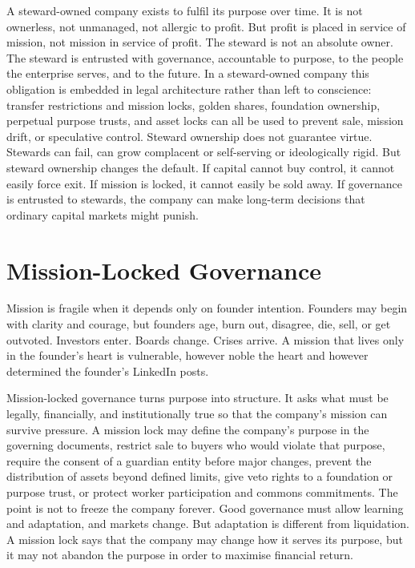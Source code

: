 \documentclass[11pt,a4paper,oneside]{book}
\begin{document}
A steward-owned company exists to fulfil its purpose over time. It is not ownerless, not unmanaged, not allergic to profit. But profit is placed in service of mission, not mission in service of profit. The steward is not an absolute owner. The steward is entrusted with governance, accountable to purpose, to the people the enterprise serves, and to the future. In a steward-owned company this obligation is embedded in legal architecture rather than left to conscience: transfer restrictions and mission locks, golden shares, foundation ownership, perpetual purpose trusts, and asset locks can all be used to prevent sale, mission drift, or speculative control. Steward ownership does not guarantee virtue. Stewards can fail, can grow complacent or self-serving or ideologically rigid. But steward ownership changes the default. If capital cannot buy control, it cannot easily force exit. If mission is locked, it cannot easily be sold away. If governance is entrusted to stewards, the company can make long-term decisions that ordinary capital markets might punish.

\section*{Mission-Locked Governance}

Mission is fragile when it depends only on founder intention. Founders may begin with clarity and courage, but founders age, burn out, disagree, die, sell, or get outvoted. Investors enter. Boards change. Crises arrive. A mission that lives only in the founder's heart is vulnerable, however noble the heart and however determined the founder's LinkedIn posts.

Mission-locked governance turns purpose into structure. It asks what must be legally, financially, and institutionally true so that the company's mission can survive pressure. A mission lock may define the company's purpose in the governing documents, restrict sale to buyers who would violate that purpose, require the consent of a guardian entity before major changes, prevent the distribution of assets beyond defined limits, give veto rights to a foundation or purpose trust, or protect worker participation and commons commitments. The point is not to freeze the company forever. Good governance must allow learning and adaptation, and markets change. But adaptation is different from liquidation. A mission lock says that the company may change how it serves its purpose, but it may not abandon the purpose in order to maximise financial return.
\end{document}
